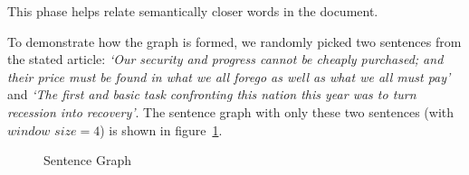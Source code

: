 \documentclass[a4paper]{report}
\begin{document}
This phase helps relate semantically closer words in the document. 
\par To demonstrate how the graph is formed, we randomly picked two sentences from the stated article:
{\em `Our security and progress cannot be cheaply purchased; and their price must be found in what we all forego as well as what we all must pay'} and {\em `The first and basic task confronting this nation this year was to turn recession into recovery'}.
The sentence graph with only these two sentences (with $window$ $size = 4$) is shown in figure~\ref{sfig}. 
\begin{figure}
\CenterFloatBoxes
\begin{floatrow}
{\caption{Sentence Graph}\label{sfig}
}
\killfloatstyle
{}
\end{floatrow}
\end{figure}
\end{document}
